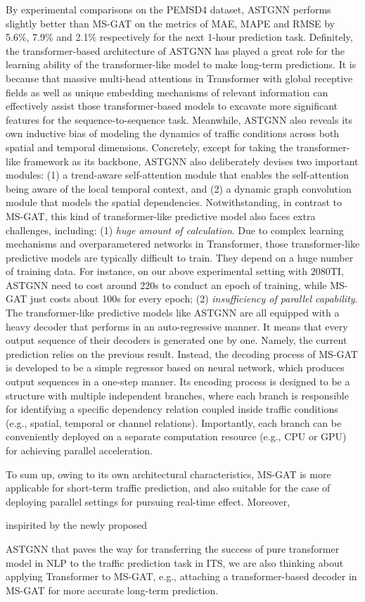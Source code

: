 By experimental comparisons on the PEMSD4 dataset, ASTGNN performs slightly better than MS-GAT on the metrics of MAE, MAPE and RMSE by 5.6\%, 7.9\% and 2.1\% respectively for the next 1-hour prediction task. Definitely, the transformer-based architecture of ASTGNN has played a great role for the learning ability of the transformer-like model to make long-term predictions. It is because that massive multi-head attentions in Transformer with global receptive fields as well as unique embedding mechanisms of relevant information can effectively assist those transformer-based models to excavate more significant features for the sequence-to-sequence task. Meanwhile, ASTGNN also reveals its own inductive bias of modeling the dynamics of traffic conditions across both spatial and temporal dimensions. Concretely, except for taking the transformer-like framework as its backbone, ASTGNN also deliberately devises two important modules: (1) a trend-aware self-attention module that enables the self-attention being aware of the local temporal context, and (2) a dynamic graph convolution module that models the spatial dependencies. Notwithstanding, in contrast to MS-GAT, this kind of transformer-like predictive model also faces extra challenges, including: (1) \textit{huge amount of calculation}. Due to complex learning mechanisms and overparametered networks in Transformer, those transformer-like predictive models are typically difficult to train. They depend on a huge number of training data. For instance, on our above experimental setting with 2080TI, ASTGNN need to cost around 220s to conduct an epoch of training, while MS-GAT just costs about 100s for every epoch; (2) \textit{insufficiency of parallel capability}. The transformer-like predictive models like ASTGNN are all equipped with a heavy decoder that performs in an auto-regressive manner. It means that every output sequence of their decoders is generated one by one. Namely, the current prediction relies on the previous result. Instead, the decoding process of MS-GAT is developed to be a simple regressor based on neural network, which produces output sequences in a one-step manner. Its encoding process is designed to be a structure with multiple independent branches, where each branch is responsible for identifying a specific dependency relation coupled inside traffic conditions (e.g., spatial, temporal or channel relations). Importantly, each branch can be conveniently deployed on a separate computation resource (e.g., CPU or GPU) for achieving parallel acceleration. 

To sum up, owing to its own architectural characteristics, MS-GAT is more applicable for short-term traffic prediction, and also suitable for the case of deploying parallel settings for pursuing real-time effect. Moreover, 

inspirited by the newly proposed 

ASTGNN that paves the way for transferring the success of pure transformer model in NLP to the traffic prediction task in ITS, we are also thinking about applying Transformer to MS-GAT, e.g., attaching a transformer-based decoder in MS-GAT for more accurate long-term prediction. 
